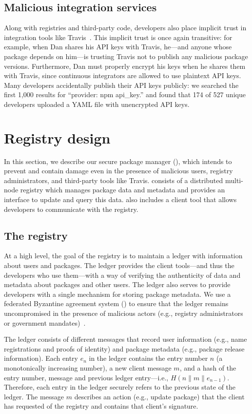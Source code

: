 \subsection{Malicious integration services}
Along with registries and third-party code, developers also place implicit
trust in integration tools like Travis~\cite{travis}. This implicit trust is
once again transitive: for example, when Dan shares his API keys with Travis,
he---and anyone whose package depends on him---is trusting Travis not to
publish any malicious package versions. Furthermore, Dan must properly encrypt
his keys when he shares them with Travis, since continuous integrators are
allowed to use plaintext API keys. Many developers accidentally publish their
API keys publicly: we searched the first 1,000 \gh results for ``provider: npm
api\_key.'' and found that 174 of 527 unique \gh developers uploaded a YAML
file with unencrypted API keys. 


\section{Registry design}\label{design}
In this section, we describe our secure package manager (\spam), which intends
to prevent and contain damage even in the presence of malicious users, registry
administrators, and third-party tools like Travis. \spam consists of a
distributed multi-node registry which manages package data and metadata and
provides an interface to update and query this data. \spam also includes a
client tool that allows developers to communicate with the registry.

\subsection{The registry}
At a high level, the goal of the registry is to maintain a ledger with
information about users and packages. The ledger provides the client
tools---and thus the developers who use them---with a way of verifying the
authenticity of data and metadata about packages and other users. The ledger
also serves to provide developers with a single mechanism for storing package
metadata. We use a federated Byzantine agreement system (\fbas) to ensure that
the ledger remains uncompromised in the presence of malicious actors (e.g.,
registry administrators or government mandates)~\cite{stellar}.

The ledger consists of different messages that record user information (e.g.,
name registrations and proofs of identity) and package metadata (e.g., package
release information). Each entry $e_n$ in the ledger contains the entry number
$n$ (a monotonically increasing number), a new client message $m$, and a hash
of the entry number, message and previous ledger entry---i.e.,
$H(n\|m\|e_{n-1})$. Therefore, each entry in the ledger securely refers to the
previous state of the ledger.  The message $m$ describes an action (e.g.,
update package) that the client has requested of the registry and contains that
client's signature. 

